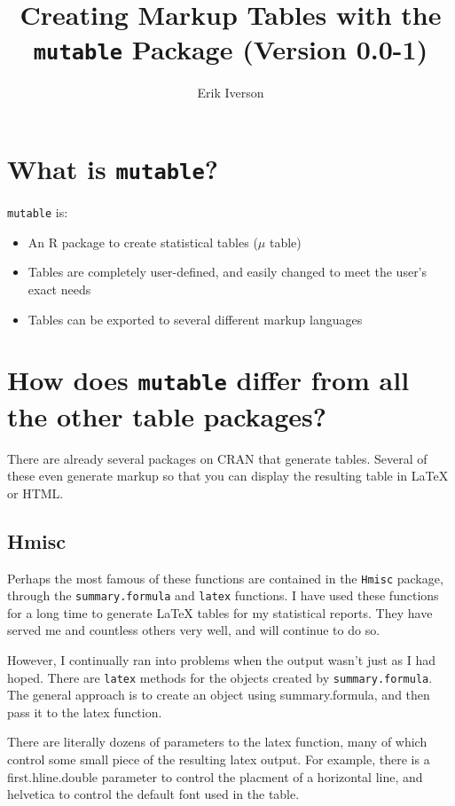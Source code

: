 \documentclass{article}
\begin{document}
\title{Creating Markup Tables with the \texttt{mutable} Package (Version 0.0-1)}

\author{Erik Iverson}
\maketitle

\section{What is \texttt{mutable}?}

\texttt{mutable} is: 
\begin{itemize}
  \item An R package to create statistical tables ($\mu$ table)
  \item Tables are completely user-defined, and easily changed to meet the user's exact needs
  \item Tables can be exported to several different markup languages
\end{itemize}

\section{How does \texttt{mutable} differ from all the other table packages?}

There are already several packages on CRAN that generate
tables. Several of these even generate markup so that you can
display the resulting table in \LaTeX{} or HTML. 


\subsection{Hmisc}
Perhaps the most famous of these functions are contained in the
\texttt{Hmisc} package, through the \texttt{summary.formula} and
\texttt{latex} functions.  I have used these functions for a long time
to generate \LaTeX{} tables for my statistical reports.  They have
served me and countless others very well, and will continue to do so.

However, I continually ran into problems when the output wasn't just
as I had hoped. There are \texttt{latex} methods for the objects
created by \texttt{summary.formula}.  The general approach is to
create an object using summary.formula, and then pass it to the latex
function. 

There are literally dozens of parameters to the latex function, many
of which control some small piece of the resulting latex output.  For
example, there is a first.hline.double parameter to control the
placment of a horizontal line, and helvetica to control the default
font used in the table. 
\end{document}
